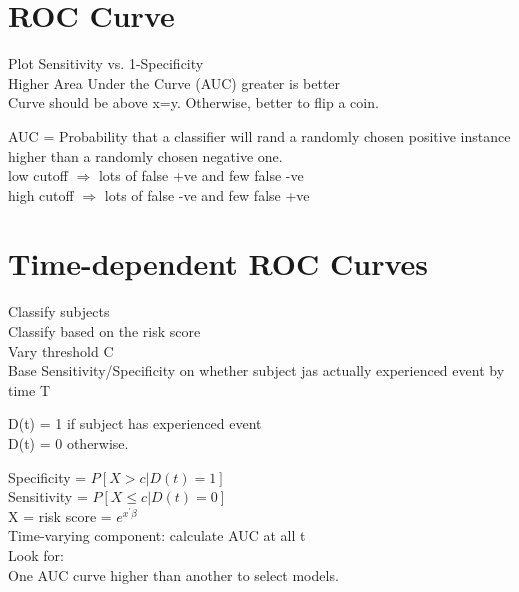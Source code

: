 \documentclass{article}                                                   %
\def\wl{\par \vspace{\baselineskip}}                                      %
\begin{document}
  \section{ROC Curve}
  Plot Sensitivity vs. 1-Specificity \\
  Higher Area Under the Curve (AUC) greater is better \\
  Curve should be above x=y. Otherwise, better to flip a coin. \\
  \wl\noindent
  AUC = Probability that a classifier will rand a randomly chosen
  positive instance higher than a randomly chosen negative one. \\

  \noindent
  low  cutoff $\Rightarrow$ lots of false +ve and few false -ve \\
  high cutoff $\Rightarrow$ lots of false -ve and few false +ve \\

  \section{Time-dependent ROC Curves}
  Classify subjects\\
  Classify based on the risk score\\
  Vary threshold C\\
  Base Sensitivity/Specificity on whether subject
  jas actually experienced event by time T\\
  \wl\noindent
  D(t) = 1 if subject has experienced event\\
  D(t) = 0 otherwise.\\
  \wl\noindent
  Specificity = $P[X>c|D(t)=1]$\\
  Sensitivity = $P[X\le c|D(t)=0]$\\
  X = risk score = $e^{x^\prime\beta}$\\
  Time-varying component: calculate AUC at all t\\
  Look for:\\
  One AUC curve higher than another to select models.\\
\end{document}
